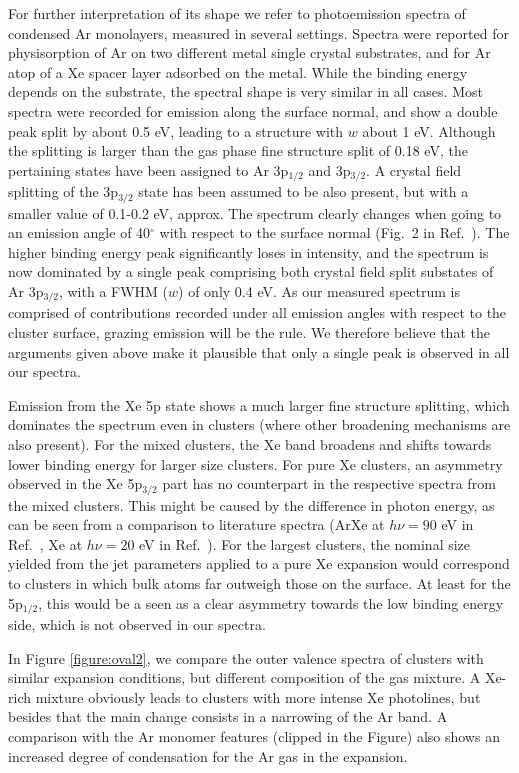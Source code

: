 For further interpretation of its shape we refer to photoemission spectra of condensed Ar monolayers, measured in several settings.\cite{jacobi,jacobi2}
Spectra were reported for physisorption of Ar on two different metal single crystal substrates, and for Ar atop of a Xe spacer layer adsorbed on the metal.
While the binding energy depends on the substrate, the spectral shape is very similar in all cases. 
Most spectra were recorded for emission along the surface normal, and show a double peak split by about 0.5 eV, leading to a structure with $w$ about 1 eV.
Although the splitting is larger than the gas phase fine structure split of 0.18 eV, the pertaining states have been assigned to Ar 3p$_{1/2}$ and 3p$_{3/2}$.
A crystal field splitting of the 3p$_{3/2}$ state has been assumed to be also present, but with a smaller value of 0.1-0.2 eV, approx.\cite{jacobi2} 
The spectrum clearly changes when going to an emission angle of 40$^\circ$ with respect to the surface normal (Fig.\ 2 in Ref.\ ).
The higher binding energy peak significantly loses in intensity, and the spectrum is now dominated by a single peak comprising both crystal field split substates of Ar 3p$_{3/2}$, with a FWHM ($w$) of only 0.4 eV.
As our measured spectrum is comprised of contributions recorded under all emission angles with respect to the cluster surface, grazing emission will be the rule.
We therefore believe that the arguments given above make it plausible that only a single peak is observed in all our spectra.

Emission from the Xe 5p state shows a much larger fine structure splitting, which dominates the spectrum even in clusters (where other broadening mechanisms are also present). 
For the mixed clusters, the Xe band broadens and shifts towards lower binding energy for larger size clusters. 
For pure Xe clusters, an asymmetry observed in the Xe 5p$_{3/2}$ part has no counterpart in the respective spectra from the mixed clusters.
This might be caused by the difference in photon energy, as can be seen from a comparison to literature spectra (ArXe at $h\nu = 90$ eV in Ref.\ , Xe at $h\nu = 20$ eV in Ref.\ ).
For the largest clusters, the nominal size yielded from the jet parameters applied to a pure Xe expansion would correspond to clusters in which bulk atoms far outweigh those on the surface.
At least for the 5p$_{1/2}$, this would be a seen as a clear asymmetry towards the low binding energy side, which is not observed in our spectra.

In Figure \ref{figure:oval2}, we compare the outer valence spectra of clusters with similar expansion conditions, but different composition of the gas mixture.
A Xe-rich mixture obviously leads to clusters with more intense Xe photolines, but besides that the main change consists in a narrowing of the Ar band.
A comparison with the Ar monomer features (clipped in the Figure) also shows an increased degree of condensation for the Ar gas in the expansion.

